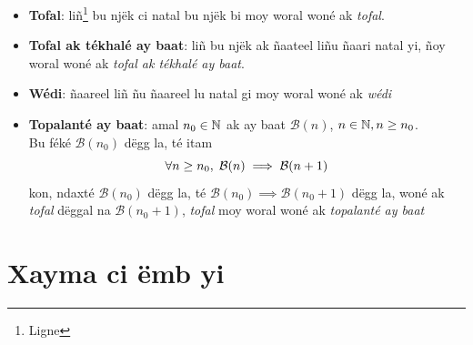 \documentclass[twoside, a4paper]{article}
\begin{document}
\begin{tcolorbox}[enhanced jigsaw,breakable,pad at break*=1mm, colback=orange!5!white,colframe=white!75!black,title= Seetlu,
    watermark color=white]
  \begin{itemize}
    \item \textbf{Tofal}: liñ\footnote{Ligne} bu njëk ci natal bu njëk bi moy woral woné ak \textit{tofal}.
    \item \textbf{Tofal ak tékhalé ay baat}: liñ bu njëk ak ñaateel liñu ñaari natal yi, ñoy woral woné ak \textit{tofal ak tékhalé ay baat}.
    \item \textbf{Wédi}: ñaareel liñ ñu ñaareel lu natal gi moy woral woné ak \textit{wédi}
    \item \textbf{Topalanté ay baat}: amal $n_0 \in \mathbb{N}$ ak ay baat $\mathcal{B}(n)$, $n \in \mathbb{N}, n \geq n_0$.\\
          Bu féké $\mathcal{B}(n_0)$ dëgg la, té itam
          $$\forall n\geq n_0, \hspace{0.1cm}\mathcal{B}(n) \implies \mathcal{B}(n+1)$$
          kon, ndaxté $\mathcal{B}(n_0)$ dëgg la, té $\mathcal{B}(n_0) \implies \mathcal{B}(n_0+1)$ dëgg la, woné ak \textit{tofal} dëggal na $\mathcal{B}(n_0+1)$, \textit{tofal} moy woral woné ak \textit{topalanté ay baat}
  \end{itemize}

\end{tcolorbox}


\section{Xayma ci ëmb yi}

\end{document}
